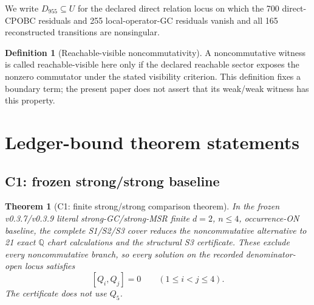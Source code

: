 \documentclass[11pt]{article}
\newtheorem{theorem}{Theorem}
\theoremstyle{definition}
\newtheorem{definition}{Definition}
\theoremstyle{remark}
\newcommand{\QQ}{\mathbb{Q}}
\begin{document}
We write \(D_{955}\subseteq U\) for the declared direct relation locus on
which the 700 direct-CPOBC residuals and 255 local-operator-GC residuals
vanish and all 165 reconstructed transitions are nonsingular.

\begin{definition}[Reachable-visible noncommutativity]
A noncommutative witness is called reachable-visible here only if the
declared reachable sector exposes the nonzero commutator under the stated
visibility criterion.  This definition fixes a boundary term; the present
paper does not assert that its weak/weak witness has this property.
\end{definition}

\section{Ledger-bound theorem statements}

\subsection{C1: frozen strong/strong baseline}

\begin{theorem}[C1: finite strong/strong comparison theorem]
\label{thm:c1}
In the frozen v0.3.7/v0.3.9 literal strong-GC/strong-MSR finite
\(d=2\), \(n\leq4\), occurrence-ON baseline, the complete S1/S2/S3 cover
reduces the noncommutative alternative to 21 exact \(\QQ\) chart
calculations and the structural S3 certificate.  These exclude every
noncommutative branch, so every solution on the recorded denominator-open
locus satisfies
\[
  [Q_i,Q_j]=0\qquad(1\leq i<j\leq4).
\]
The certificate does not use \(Q_5\).
\end{theorem}
\end{document}
